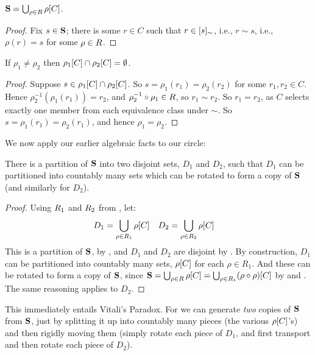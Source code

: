 \documentclass[../../../include/open-logic-section]{subfiles}
\begin{document}
\begin{lem}
$\onesphere = \bigcup_{\rho \in \rotationsgroup} \funimage{\rho}{C}$.
\end{lem}

\begin{proof}
Fix $s \in \onesphere$; there is some $r \in C$ such that $r \in
\equivrep{s}{\sim}$, i.e., $r \sim s$, i.e., $\rho(r) = s$ for some
$\rho \in \rotationsgroup$. 
\end{proof}

\begin{lem}
If $\rho_1 \neq \rho_2$ then $\funimage{\rho_1}{C} \cap \funimage{\rho_2}{C} = \emptyset$. 
\end{lem}

\begin{proof}
Suppose $s \in \funimage{\rho_{1}}{C} \cap \funimage{\rho_{2}}{C}$. So
$s = \rho_{1}(r_{1}) = \rho_{2}(r_{2})$ for some $r_{1}, r_{2} \in C$.
Hence $\rho^{-1}_2(\rho_1(r_1)) = r_2$, and
$\comp{\rho_1}{\rho^{-1}_2} \in \rotationsgroup$, so $r_{1} \sim
r_{2}$. So $r_1 = r_2$, as $C$ selects exactly one member from each
equivalence class under $\sim$. So $s = \rho_1(r_1) = \rho_2(r_1)$,
and hence $\rho_1 = \rho_2$.
\end{proof}

We now apply our earlier algebraic facts to our circle:

\begin{lem}
There is a partition of $\onesphere$ into two disjoint sets, $D_{1}$
and $D_{2}$, such that $D_{1}$ can be partitioned into countably many
sets which can be rotated to form a copy of $\onesphere$ (and
similarly for $D_{2}$).
\end{lem}

\begin{proof}
Using $\rotationsgroup_{1}$ and $\rotationsgroup_{2}$ from , let:
\begin{align*}
	D_{1} &= \bigcup_{\rho \in \rotationsgroup_1} \funimage{\rho}{C} & 
	D_{2} &= \bigcup_{\rho \in \rotationsgroup_2} \funimage{\rho}{C}
\end{align*}
This is a partition of $\onesphere$, by , and $D_1$
and $D_2$ are disjoint by . By construction,
$D_1$ can be partitioned into countably many sets,
$\funimage{\rho}{C}$ for each $\rho \in R_1$. And these can be rotated
to form a copy of $\onesphere$, since $\onesphere = \bigcup_{\rho \in
\rotationsgroup}\funimage{\rho}{C} = \bigcup_{\rho \in
\rotationsgroup_1}\funimage{(\comp{\rho}{\rho})}{C}$ by
 and . The same reasoning
applies to $D_2$. \end{proof}\noindent This immediately entails
Vitali's Paradox. For we can generate \emph{two} copies of
$\onesphere$ from $\onesphere$, just by splitting it up into countably
many pieces (the various $\funimage{\rho}{C}$'s) and then rigidly
moving them (simply rotate each piece of $D_1$, and first transport
and then rotate each piece of $D_2$).
\end{document}
